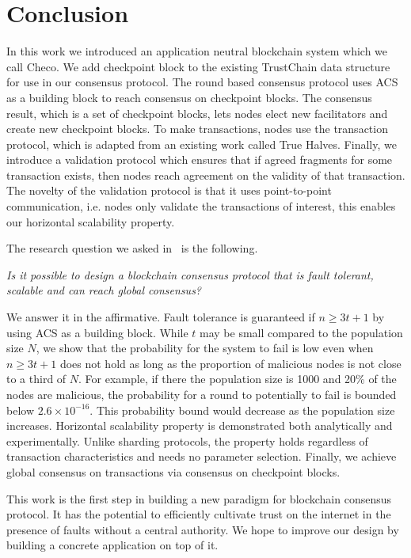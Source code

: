 \chapter{Conclusion}
\label{ch:conclusion}

In this work we introduced an application neutral blockchain system which we call Checo.
We add checkpoint block to the existing TrustChain data structure for use in our consensus protocol.
The round based consensus protocol uses ACS as a building block to reach consensus on checkpoint blocks.
The consensus result, which is a set of checkpoint blocks, lets nodes elect new facilitators and create new checkpoint blocks.
To make transactions, nodes use the transaction protocol,
which is adapted from an existing work called True Halves.
Finally, we introduce a validation protocol which ensures that if agreed fragments for some transaction exists,
then nodes reach agreement on the validity of that transaction.
The novelty of the validation protocol is that it uses point-to-point communication,
i.e. nodes only validate the transactions of interest,
this enables our horizontal scalability property.

The research question we asked in~ is the following.
\begin{displayquote}
\emph{Is it possible to design a blockchain consensus protocol that is fault tolerant, scalable and can reach global consensus?}
\end{displayquote}
We answer it in the affirmative.
Fault tolerance is guaranteed if $n \ge 3t + 1$ by using ACS as a building block.
While $t$ may be small compared to the population size $N$,
we show that the probability for the system to fail is low even when $n \ge 3t + 1$ does not hold as long as the proportion of malicious nodes is not close to a third of $N$.
For example, if there the population size is 1000 and 20\% of the nodes are malicious,
the probability for a round to potentially to fail is bounded below $2.6 \times 10^{-16}$.
This probability bound would decrease as the population size increases.
Horizontal scalability property is demonstrated both analytically and experimentally.
Unlike sharding protocols, the property holds regardless of transaction characteristics and needs no parameter selection.
Finally, we achieve global consensus on transactions via consensus on checkpoint blocks.

This work is the first step in building a new paradigm for blockchain consensus protocol.
It has the potential to efficiently cultivate trust on the internet in the presence of faults without a central authority.
We hope to improve our design by building a concrete application on top of it.

